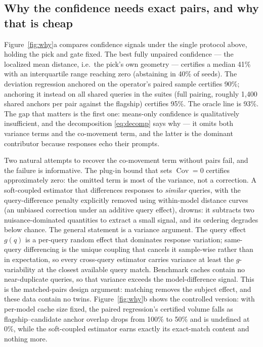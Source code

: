 \documentclass{article}
\begin{document}
\subsection{Why the confidence needs exact pairs, and why that is cheap}
\label{sec:why}

Figure~\ref{fig:why}a compares confidence signals under the single
protocol above, holding the pick and gate fixed. The best fully unpaired
confidence --- the localized mean distance, i.e.\ the pick's own geometry
--- certifies a median 41\% with an interquartile range reaching zero
(abstaining in 40\% of seeds). The deviation regression anchored on the
operator's paired sample certifies 90\%; anchoring it instead on all
shared queries in the suites (full pairing, roughly 1{,}400 shared anchors
per pair against the flagship) certifies 95\%. The oracle line is 93\%.
The gap that matters is the first one: means-only confidence is
qualitatively insufficient, and the decomposition \eqref{eq:decomp} says
why --- it omits both variance terms and the co-movement term, and the
latter is the dominant contributor because responses echo their prompts.

Two natural attempts to recover the co-movement term without pairs fail,
and the failure is informative. The plug-in bound that sets
$\operatorname{Cov} = 0$ certifies approximately zero: the omitted term is
most of the variance, not a correction. A soft-coupled estimator that
differences responses to \emph{similar} queries, with the query-difference
penalty explicitly removed using within-model distance curves (an unbiased
correction under an additive query effect), drowns: it subtracts two
nuisance-dominated quantities to extract a small signal, and its ordering
degrades below chance. The general statement is a variance argument.
The query effect $g(q)$ is a per-query random effect that dominates
response variation; same-query differencing is the unique coupling that
cancels it sample-wise rather than in expectation, so every cross-query
estimator carries variance at least the $g$-variability at the closest
available query match. Benchmark caches contain no near-duplicate queries,
so that variance exceeds the model-difference signal. This is the
matched-pairs design argument: matching removes the subject effect, and
these data contain no twins. Figure~\ref{fig:why}b shows the controlled
version: with per-model cache size fixed, the paired regression's
certified volume falls as flagship--candidate anchor overlap drops from
100\% to 50\% and is undefined at 0\%, while the soft-coupled estimator
earns exactly its exact-match content and nothing more.
\end{document}
